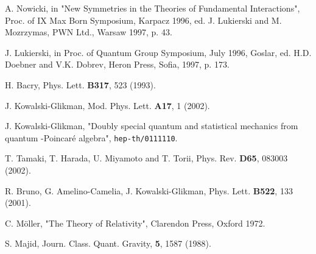 \documentclass[a4paper,12pt]{article}
\begin{document}
\begin{thebibliography}{99}
A. Nowicki, in "New Symmetries in the Theories of
Fundamental Interactions", Proc. of IX Max Born Symposium, Karpacz
1996, ed. J. Lukierski and M. Mozrzymas, PWN Ltd., Warsaw 1997, p.
43.

J. Lukierski, in Proc. of Quantum Group
Symposium, July 1996, Goslar, ed. H.D. Doebner and V.K. Dobrev,
Heron Press, Sofia, 1997, p. 173.

H. Bacry, Phys. Lett. {\bf B317}, 523 (1993).

J. Kowalski-Glikman, Mod. Phys. Lett. {\bf A17}, 1
(2002).

J. Kowalski-Glikman, "Doubly special quantum and
statistical mechanics from quantum \myHighlight{$\kappa$}\coordHE{}-Poincar\'{e} algebra",
{\tt hep-th/0111110}.

T. Tamaki, T. Harada, U. Miyamoto and T. Torii, Phys. Rev. 
{\bf D65}, 083003 (2002).

R. Bruno, G. Amelino-Camelia, J. Kowalski-Glikman,
Phys. Lett. {\bf B522}, 133 (2001).

C. M\"{o}ller, "The Theory of Relativity", Clarendon
Press, Oxford 1972.

S. Majid, Journ. Class. Quant. Gravity, {\bf 5}, 1587
(1988).



\end{thebibliography}













 
\end{document}
